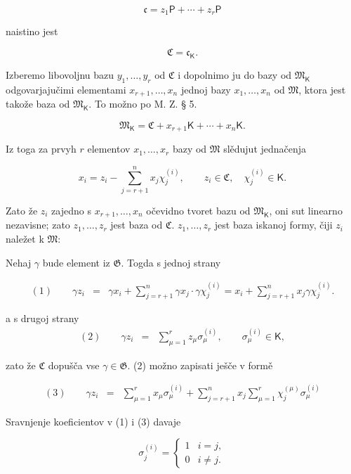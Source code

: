 \documentclass[11pt]{article}
\begin{document}
\[
\mathfrak c=z_1\mathsf P+\cdots+z_r\mathsf P
\]

naistino jest

\[
\mathfrak C=\mathfrak c_{\mathsf K}.
\]

Izberemo libovoljnu bazu \(y_1,\ldots,y_r\) od \(\mathfrak C\) i dopolnimo ju do bazy od \(\mathfrak M_{\mathsf K}\) odgovarjajučimi elementami \(x_{r+1},\ldots,x_n\) jednoj bazy \(x_1,\ldots,x_n\) od \(\mathfrak M\), ktora jest takože baza od \(\mathfrak M_{\mathsf K}\). To možno po M. Z. § 5.

\[
\mathfrak M_{\mathsf K}=\mathfrak C+x_{r+1}\mathsf K+\cdots+x_n\mathsf K.
\]

Iz toga za prvyh \(r\) elementov \(x_1,\ldots,x_r\) bazy od \(\mathfrak M\) slědujut jednačenja

\[
x_i=z_i-\sum_{j=r+1}^{n}x_j\chi_j^{(i)},\qquad
z_i\in\mathfrak C,\quad \chi_j^{(i)}\in\mathsf K.
\]

Zato že \(z_i\) zajedno s \(x_{r+1},\ldots,x_n\) očevidno tvoret bazu od \(\mathfrak M_{\mathsf K}\), oni sut linearno nezavisne; zato \(z_1,\ldots,z_r\) jest baza od \(\mathfrak C\). \(z_1,\ldots,z_r\) jest baza iskanoj formy, čiji \(z_i\) naležet k \(\mathfrak M\):

Nehaj \(\gamma\) bude element iz \(\mathfrak G\). Togda s jednoj strany

\[
\begin{array}{rcl}
(1)\qquad \gamma z_i
&=&\gamma x_i+\displaystyle\sum_{j=r+1}^{n}\gamma x_j\cdot \gamma\chi_j^{(i)}
=x_i+\displaystyle\sum_{j=r+1}^{n}x_j\gamma\chi_j^{(i)}.
\end{array}
\]

a s drugoj strany
\[
\begin{array}{rcl}
(2)\qquad \gamma z_i&=&\displaystyle\sum_{\mu=1}^{r}z_\mu\sigma_\mu^{(i)},
\qquad \sigma_\mu^{(i)}\in\mathsf K,
\end{array}
\]

zato že \(\mathfrak C\) dopušča vse \(\gamma\in\mathfrak G\). (2) možno zapisati ješče v formě

\[
\begin{array}{rcl}
(3)\qquad \gamma z_i
&=&\displaystyle\sum_{\mu=1}^{r}x_\mu\sigma_\mu^{(i)}
+\displaystyle\sum_{j=r+1}^{n}x_j\sum_{\mu=1}^{r}\chi_j^{(\mu)}\sigma_\mu^{(i)}
\end{array}
\]

Sravnjenje koeficientov v (1) i (3) davaje

\[
\sigma_j^{(i)}=
\begin{cases}
1 & i=j,\\
0 & i\ne j.
\end{cases}
\]
\end{document}
